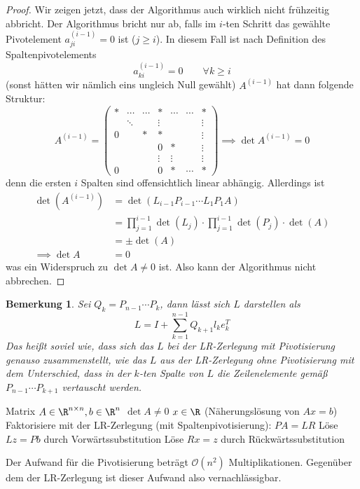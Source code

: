 \documentclass{mycourse}
\newtheorem{notee}[thm]{Bemerkung}
\begin{document}
\begin{st}
\begin{proof}
		Wir zeigen jetzt, dass der Algorithmus auch wirklich nicht frühzeitig abbricht.
		Der Algorithmus bricht nur ab, falls im $i$-ten Schritt das gewählte Pivotelement $a_{ji}^{(i-1)} = 0$ ist ($j\ge i$).
		In diesem Fall ist nach Definition des Spaltenpivotelements
		\[
			a_{ki}^{(i-1)} = 0 \qquad \forall k\ge i
		\]
		(sonst hätten wir nämlich eins ungleich Null gewählt)
		$A^{(i-1)}$ hat dann folgende Struktur:
		\[
			A^{(i-1)} = \begin{pmatrix}
				* & \cdots & \cdots & *      & \cdots & \cdots & *\\
				  & \ddots &        & \vdots &        &        & \vdots\\
				0 &        & *      & *      &       &        & \vdots\\
				  &        &        & 0      & *      &        & \vdots\\
				  &   &        & \vdots & \vdots &        & \vdots\\
				0 & &  & 0      & *      & \cdots & *
			\end{pmatrix} \implies \det A^{(i-1)} = 0
		\]
		denn die ersten $i$ Spalten sind offensichtlich linear abhängig.
		Allerdings ist
		\begin{align*}
			\det( A^{(i-1)}) &= \det(L_{i-1}P_{i-1}\dotsb L_1P_1 A) \\
																	   &= \prod_{j=1}^{i-1}\det (L_j) \cdot \prod_{j=1}^{i-1}\det(P_j) \cdot \det(A)\\
												  &= \pm \det(A)\\
			\implies \det A &= 0
		\end{align*}
		was ein Widerspruch zu $\det A \neq 0$ ist.
		Also kann der Algorithmus nicht abbrechen.
	\end{proof}
\end{st}

\begin{notee}
	\label{note:3.9}
	Sei $Q_k = P_{n-1}\dotsb P_k$, dann lässt sich $L$ darstellen als
	\[
		L =  I + \sum_{k=1}^{n-1}Q_{k+1}l_ke_k^T
	\]
	Das heißt soviel wie, dass sich das $L$ bei der LR-Zerlegung mit Pivotisierung genauso zusammenstellt, wie das $L$ aus der LR-Zerlegung ohne Pivotisierung mit dem Unterschied, dass in der $k$-ten Spalte von $L$ die Zeilenelemente gemäß $P_{n-1}\dotsb P_{k+1}$ vertauscht werden.
\end{notee}

\setcounter{thm}{9}
\begin{alg}
	\label{alg:3.10}
	\begin{algorithmic}
		\Input Matrix $A\in \R^{n\times n}, b\in \R^n$
		\Assume $\det{A}\neq 0$
		\Output $x\in \R$ (Näherungslösung von $Ax=b$)
		\Statex
		\State Faktorisiere mit der LR-Zerlegung (mit Spaltenpivotisierung): $PA = LR$
		\State Löse $Lz = Pb$ durch Vorwärtssubstitution
		\State Löse $Rx = z$ durch Rückwärtssubstitution
	\end{algorithmic}
	Der Aufwand für die Pivotisierung beträgt $\mathcal O(n^2)$ Multiplikationen.
	Gegenüber dem der LR-Zerlegung ist dieser Aufwand also vernachlässigbar.
\end{alg}
\end{document}
